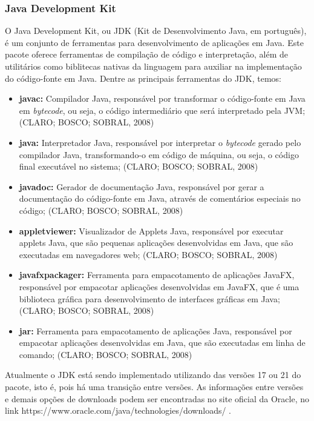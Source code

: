 \documentclass[a4paper,12pt]{article}
\begin{document}
\subsubsection{Java Development Kit}
O Java Development Kit, ou JDK (Kit de Desenvolvimento Java, em português), é um conjunto de ferramentas para desenvolvimento de aplicações em Java. Este pacote oferece ferramentas 
de compilação de código e interpretação, além de utilitários como biblitecas nativas da linguagem para auxiliar na implementação do código-fonte em Java. Dentre as principais ferramentas do JDK, temos:
\begin{itemize}
	\item \textbf{javac:} Compilador Java, responsável por transformar o código-fonte em Java em \textit{bytecode}, ou seja, o código intermediário que será interpretado pela JVM; (CLARO; BOSCO; SOBRAL, 2008)
	\item \textbf{java:} Interpretador Java, responsável por interpretar o \textit{bytecode} gerado pelo compilador Java, transformando-o em código de máquina, ou seja, o código final executável no sistema; (CLARO; BOSCO; SOBRAL, 2008)
	\item \textbf{javadoc:} Gerador de documentação Java, responsável por gerar a documentação do código-fonte em Java, através de comentários especiais no código; (CLARO; BOSCO; SOBRAL, 2008)
	\item \textbf{appletviewer:} Visualizador de Applets Java, responsável por executar applets Java, que são pequenas aplicações desenvolvidas em Java, que são executadas em navegadores web; (CLARO; BOSCO; SOBRAL, 2008)
	\item \textbf{javafxpackager:} Ferramenta para empacotamento de aplicações JavaFX, responsável por empacotar aplicações desenvolvidas em JavaFX, que é uma biblioteca gráfica para desenvolvimento de interfaces gráficas em Java; (CLARO; BOSCO; SOBRAL, 2008)
	\item \textbf{jar:} Ferramenta para empacotamento de aplicações Java, responsável por empacotar aplicações desenvolvidas em Java, que são executadas em linha de comando; (CLARO; BOSCO; SOBRAL, 2008)
\end{itemize}

Atualmente o JDK está sendo implementado utilizando das versões 17 ou 21 do pacote, isto é, pois há uma transição entre versões. As informações entre versões e demais opções de downloads 
podem ser encontradas no site oficial da Oracle, no link https://www.oracle.com/java/technologies/downloads/ .
\end{document}
